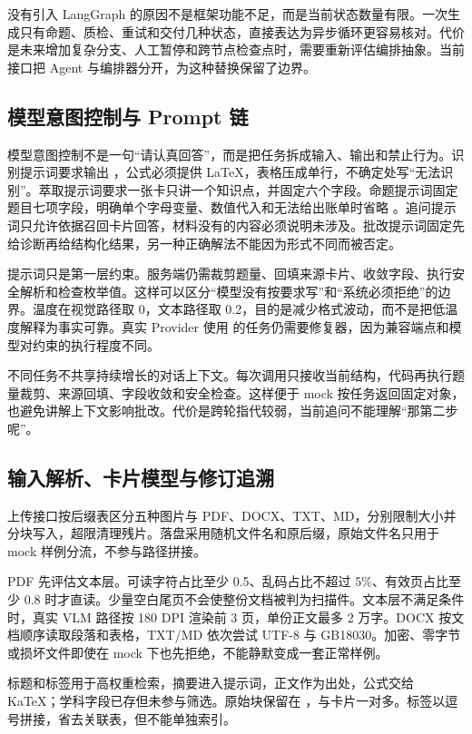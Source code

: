 没有引入 LangGraph 的原因不是框架功能不足，而是当前状态数量有限。一次生成只有命题、质检、重试和交付几种状态，直接表达为异步循环更容易核对。代价是未来增加复杂分支、人工暂停和跨节点检查点时，需要重新评估编排抽象。当前接口把 Agent 与编排器分开，为这种替换保留了边界。

\subsection{模型意图控制与 Prompt 链}

模型意图控制不是一句“请认真回答”，而是把任务拆成输入、输出和禁止行为。识别提示词要求输出 ，公式必须提供 LaTeX，表格压成单行，不确定处写“无法识别”。萃取提示词要求一张卡只讲一个知识点，并固定六个字段。命题提示词固定题目七项字段，明确单个字母变量、数值代入和无法给出账单时省略 。追问提示词只允许依据召回卡片回答，材料没有的内容必须说明未涉及。批改提示词固定先给诊断再给结构化结果，另一种正确解法不能因为形式不同而被否定。

提示词只是第一层约束。服务端仍需裁剪题量、回填来源卡片、收敛字段、执行安全解析和检查枚举值。这样可以区分“模型没有按要求写”和“系统必须拒绝”的边界。温度在视觉路径取 0，文本路径取 0.2，目的是减少格式波动，而不是把低温度解释为事实可靠。真实 Provider 使用  的任务仍需要修复器，因为兼容端点和模型对约束的执行程度不同。

不同任务不共享持续增长的对话上下文。每次调用只接收当前结构，代码再执行题量裁剪、来源回填、字段收敛和安全检查。这样便于 mock 按任务返回固定对象，也避免讲解上下文影响批改。代价是跨轮指代较弱，当前追问不能理解“那第二步呢”。

\subsection{输入解析、卡片模型与修订追溯}

上传接口按后缀表区分五种图片与 PDF、DOCX、TXT、MD，分别限制大小并分块写入，超限清理残片。落盘采用随机文件名和原后缀，原始文件名只用于 mock 样例分流，不参与路径拼接。

PDF 先评估文本层。可读字符占比至少 0.5、乱码占比不超过 5\%、有效页占比至少 0.8 时才直读。少量空白尾页不会使整份文档被判为扫描件。文本层不满足条件时，真实 VLM 路径按 180 DPI 渲染前 3 页，单份正文最多 2 万字。DOCX 按文档顺序读取段落和表格，TXT/MD 依次尝试 UTF-8 与 GB18030。加密、零字节或损坏文件即使在 mock 下也先拒绝，不能静默变成一套正常样例。

标题和标签用于高权重检索，摘要进入提示词，正文作为出处，公式交给 KaTeX；学科字段已存但未参与筛选。原始块保留在 ，与卡片一对多。标签以逗号拼接，省去关联表，但不能单独索引。

